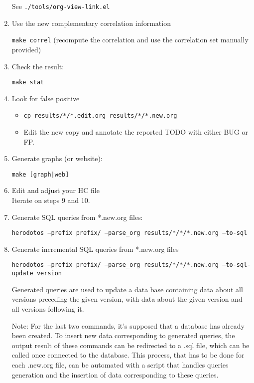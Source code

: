 \begin{enumerate}
  See \texttt{./tools/org-view-link.el}

\item Use the new complementary correlation information

  \texttt{make correl} (recompute the correlation and use the
  correlation set manually provided)

\item Check the result:

  \texttt{make stat}

\item Look for false positive

  \begin{itemize}
  \item \texttt{cp results/*/*.edit.org results/*/*.new.org}
  \item Edit the new copy and annotate the reported TODO with either
    BUG or FP.
  \end{itemize}

\item Generate graphs (or website):

  \texttt{make [graph|web]}

\item Edit and adjust your HC file\\

  Iterate on steps 9 and 10.

\item Generate SQL queries from *.new.org files:
  
  \texttt{herodotos ---prefix prefix/ ---parse\_org results/*/*/*.new.org ---to-sql}
  
\item Generate incremental SQL queries from *.new.org files

  \texttt{herodotos ---prefix prefix/ ---parse\_org results/*/*/*.new.org ---to-sql-update version}
  
  Generated queries are used to update a data base containing data about all versions preceding
  the given version, with data about the given version and all versions following it.
  
  Note: For the last two commands, it's supposed that a database has already been created. To insert 
  new data corresponding to generated queries, the output result of these commands can be redirected 
  to a .sql file, which can be called once connected to the database. This process, that has to be done
  for each .new.org file, can be automated with a script that handles queries generation and the insertion
  of data corresponding to these queries.
\end{enumerate}


